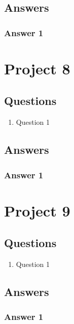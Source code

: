 \documentclass[a4paper, 12pt, english]{article}
\begin{document}
    \subsection{Answers}

    \subsubsection{Answer 1}

    \newpage


    \section{Project 8}

    \subsection{Questions}
    \begin{enumerate}
        \item Question 1
    \end{enumerate}

    \subsection{Answers}

    \subsubsection{Answer 1}

    \newpage


    \section{Project 9}

    \subsection{Questions}
    \begin{enumerate}
        \item Question 1
    \end{enumerate}

    \subsection{Answers}

    \subsubsection{Answer 1}

    \newpage
    \printbibliography

    \noindent
\end{document}

